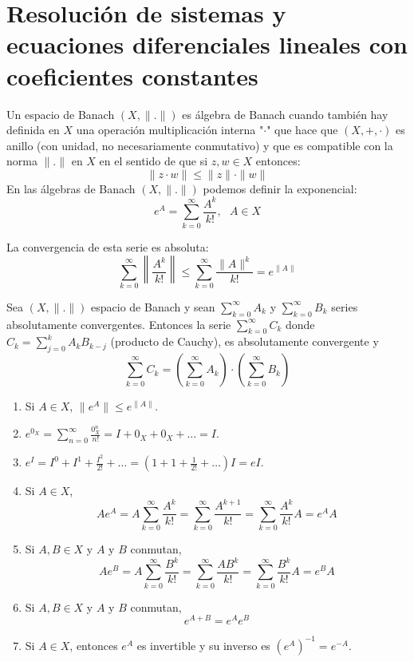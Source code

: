 \chapter{Resolución de sistemas y ecuaciones diferenciales lineales con coeficientes constantes}
\begin{definition}
    Un espacio de Banach $(X, \|.\|)$ es álgebra de Banach cuando también hay definida en $X$ una operación multiplicación interna "$\cdot$" que hace que $(X, +, \cdot)$ es anillo (con unidad, no necesariamente conmutativo) y que es compatible con la norma $\|.\|$ en $X$ en el sentido de que si $z, w \in X$ entonces:
    $$\|z \cdot w \| \leq \|z\| \cdot \|w\|$$
    En las álgebras de Banach $(X,\|.\|)$ podemos definir la exponencial:
    $$e^{A} = \sum_{k=0}^{\infty}{\frac{A^k}{k!}}, \ \ \ A \in X$$
\end{definition}

\begin{remark}
    La convergencia de esta serie es absoluta:
    $$\sum_{k=0}^{\infty}{\left\| \frac{A^k}{k!}\right\|} \leq \sum_{k=0}^{\infty}{\frac{\|A\|^k}{k!}} = e^{\|A\|}$$
\end{remark}

\begin{proposition}
    Sea $(X, \|.\|)$ espacio de Banach y sean $\sum_{k=0}^{\infty}{A_k}$ y $\sum_{k=0}^{\infty}{B_k}$ series absolutamente convergentes. Entonces la serie $\sum_{k=0}^{\infty}{C_k}$ donde $C_k = \sum_{j=0}^{k}{A_kB_{k-j}}$ (producto de Cauchy), es absolutamente convergente y
    $$\sum_{k=0}^{\infty}{C_k} = \left( \sum_{k=0}^{\infty}{A_k} \right) \cdot \left( \sum_{k=0}^{\infty}{B_k} \right)$$
\end{proposition}

\begin{properties}
    \hfill
    \begin{enumerate}
        \item Si $A \in X$, $\|e^A\| \leq e^{\|A\|}$.
        \item $e^{0_X} = \sum_{n=0}^\infty \frac{0_X^n}{n!} = I + 0_X + 0_X + \dots = I$.
        \item $e^I = I^0 + I^1 + \frac{I^2}{2!} + \dots = (1 + 1 + \frac{1}{2!} + \dots)I = eI$.
        \item Si $A \in X$,
              $$Ae^A = A\sum_{k=0}^\infty \frac{A^k}{k!} = \sum_{k=0}^\infty \frac{A^{k+1}}{k!} = \sum_{k=0}^\infty \frac{A^k}{k!} A = e^AA$$
        \item Si $A, B \in X$ y $A$ y $B$ conmutan,
              $$Ae^B = A\sum_{k=0}^\infty \frac{B^k}{k!} = \sum_{k=0}^\infty \frac{AB^k}{k!} = \sum_{k=0}^\infty \frac{B^k}{k!}A = e^BA$$
        \item Si $A, B \in X$ y $A$ y $B$ conmutan,
              $$e^{A+B} = e^Ae^B$$
        \item Si $A \in X$, entonces $e^A$ es invertible y su inverso es $(e^A)^{-1} = e^{-A}$.
    \end{enumerate}
\end{properties}

